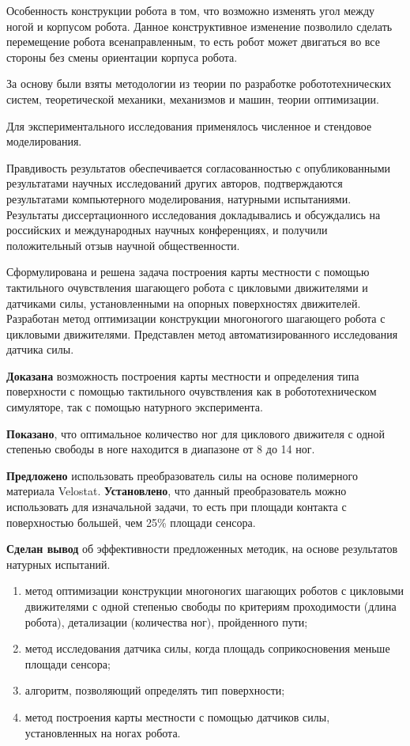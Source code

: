 Особенность конструкции робота в том, что возможно изменять угол между ногой и корпусом робота. Данное конструктивное изменение позволило сделать перемещение робота всенаправленным, то есть робот может двигаться во все стороны без смены ориентации корпуса робота.


{\methods} За основу были взяты методологии из теории по разработке робототехнических систем, теоретической механики, механизмов и машин, теории оптимизации.

Для экспериментального исследования применялось численное и стендовое моделирования.

{\reliability} Правдивость результатов обеспечивается согласованностью с опубликованными результатами научных исследований других авторов, подтверждаются результатами компьютерного моделирования, натурными испытаниями. Результаты диссертационного исследования докладывались и обсуждались на российских и международных научных конференциях, и получили положительный отзыв научной общественности.


{\novelty} Сформулирована и решена задача построения карты местности с помощью тактильного очувствления шагающего робота с цикловыми движителями и датчиками силы, установленными на опорных поверхностях движителей.
Разработан метод оптимизации конструкции многоногого шагающего робота с цикловыми движителями. 
Представлен метод автоматизированного исследования датчика силы.


\textbf{Доказана} возможность построения карты местности и определения типа поверхности с помощью тактильного очувствления как в робототехническом симуляторе, так с помощью натурного эксперимента.

\textbf{Показано}, что оптимальное количество ног для циклового движителя с одной степенью свободы в ноге находится в диапазоне от 8 до 14 ног. 

\textbf{Предложено} использовать преобразователь силы на основе полимерного материала Velostat. \textbf{Установлено}, что данный преобразователь можно использовать для изначальной задачи, то есть при площади контакта с поверхностью большей, чем 25\% площади сенсора. 

\textbf{Сделан вывод} об эффективности предложенных методик, на основе результатов натурных испытаний.

{}
\begin{enumerate}[beginpenalty=10000] %
  \item метод оптимизации конструкции многоногих шагающих роботов с цикловыми движителями с одной степенью свободы по критериям проходимости (длина робота), детализации (количества ног), пройденного пути;
  \item метод исследования датчика силы, когда площадь соприкосновения меньше площади сенсора;
  \item алгоритм, позволяющий определять тип поверхности;
  \item метод построения карты местности с помощью датчиков силы, установленных на ногах робота.
\end{enumerate}


